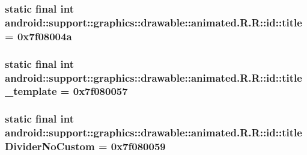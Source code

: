 \hypertarget{classandroid_1_1support_1_1graphics_1_1drawable_1_1animated_1_1_r_1_1id_48564599da1f4ff6f8059378dc61982a}{
\subsubsection[{title}]{\setlength{\rightskip}{0pt plus 5cm}static final int android::support::graphics::drawable::animated.R.R::id::title = 0x7f08004a}}
\label{classandroid_1_1support_1_1graphics_1_1drawable_1_1animated_1_1_r_1_1id_48564599da1f4ff6f8059378dc61982a}


\hypertarget{classandroid_1_1support_1_1graphics_1_1drawable_1_1animated_1_1_r_1_1id_35cc3d2e232e397c98977598bab2544b}{
\subsubsection[{title\_\-template}]{\setlength{\rightskip}{0pt plus 5cm}static final int android::support::graphics::drawable::animated.R.R::id::title\_\-template = 0x7f080057}}
\label{classandroid_1_1support_1_1graphics_1_1drawable_1_1animated_1_1_r_1_1id_35cc3d2e232e397c98977598bab2544b}


\hypertarget{classandroid_1_1support_1_1graphics_1_1drawable_1_1animated_1_1_r_1_1id_c51d5fa86c6535398f377214578d927c}{
\subsubsection[{titleDividerNoCustom}]{\setlength{\rightskip}{0pt plus 5cm}static final int android::support::graphics::drawable::animated.R.R::id::titleDividerNoCustom = 0x7f080059}}
\label{classandroid_1_1support_1_1graphics_1_1drawable_1_1animated_1_1_r_1_1id_c51d5fa86c6535398f377214578d927c}


